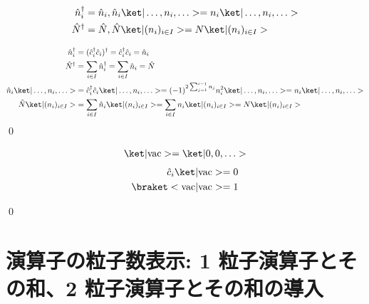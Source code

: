\documentclass[uplatex,dvipdfmx,a4paper,11pt]{jlreq}
\makeatletter
\numberwithin{equation}{section}
\theoremstyle{definition}
\renewenvironment{proof}[1][\proofname]{\par
  \normalfont
  \topsep6\p@\@plus6\p@ \trivlist
  \item[\hskip\labelsep{\bfseries #1}\@addpunct{\bfseries}]\ignorespaces\quad\par
}{%
  \qed\endtrivlist\@endpefalse
}
\renewcommand\proofname{証明}
\makeatother
\begin{document}
\begin{proposition}
  \begin{align}
    \hat{n}_i^\dagger & = \hat{n}_i, \hat{n}_i\ket|\ldots,n_i,\ldots> = n_i\ket|\ldots,n_i,\ldots> \\
    \hat{N}^\dagger   & = \hat{N}, \hat{N}\ket|(n_i)_{i\in I}> = N\ket|(n_i)_{i\in I}>
  \end{align}
\end{proposition}
\begin{proof}
  \begin{align}
    \hat{n}_i^\dagger                & = (\hat{c}_i^\dagger\hat{c}_i)^\dagger = \hat{c}_i^\dagger\hat{c}_i = \hat{n}_i                                                            \\
    \hat{N}^\dagger                  & = \sum_{i\in I}\hat{n}_i^\dagger = \sum_{i\in I}\hat{n}_i = \hat{N}                                                                        \\
    \hat{n}_i\ket|\ldots,n_i,\ldots> & = \hat{c}_i^\dagger\hat{c}_i\ket|\ldots,n_i,\ldots> = (-1)^{2\sum_{j=1}^{i-1}n_j}n_i^2\ket|\ldots,n_i,\ldots> = n_i\ket|\ldots,n_i,\ldots> \\
    \hat{N}\ket|(n_i)_{i\in I}>      & = \sum_{i\in I}\hat{n}_i\ket|(n_i)_{i\in I}> = \sum_{i\in I}n_i\ket|(n_i)_{i\in I}> = N\ket|(n_i)_{i\in I}>
  \end{align}
\end{proof}

\begin{proposition}
  \begin{align}
    \ket|\mathrm{vac}> = \ket|0,0,\ldots>
  \end{align}
  \begin{align}
    \hat{c}_i\ket|\mathrm{vac}> = 0 \\
    \braket<\mathrm{vac}|\mathrm{vac}> = 1
  \end{align}
\end{proposition}
\begin{proof}

\end{proof}

\section{演算子の粒子数表示: 1 粒子演算子とその和、2 粒子演算子とその和の導入}
\end{document}
